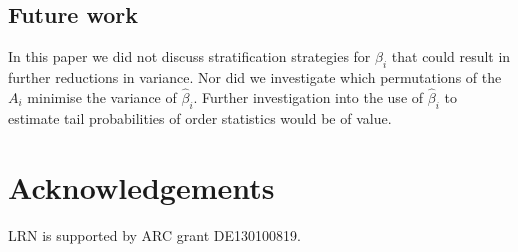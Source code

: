 \subsection{Future work}

In this paper we did not discuss stratification strategies for $\hat{\beta}_i$ that could result in further reductions in variance. Nor did we investigate which permutations of the $A_i$ minimise the variance of $\hat{\beta}_i$. Further investigation into the use of $\hat{\beta}_i$ to estimate tail probabilities of order statistics would be of value.

\section*{Acknowledgements}
 LRN is supported by ARC grant DE130100819.

